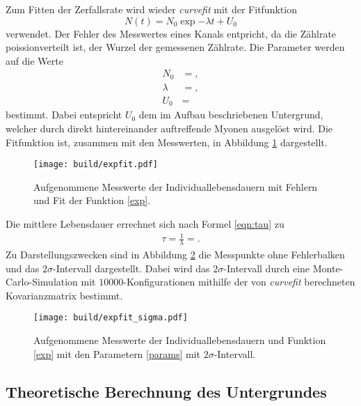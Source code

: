 Zum Fitten der Zerfallsrate wird wieder \emph{curvefit} mit der Fitfunktion
\begin{equation}
  N(t) = N_0 \exp{-\lambda t} + U_0 \label{exp}
\end{equation}
verwendet.
Der Fehler des Messwertes eines Kanals entpricht, da die Zählrate poissionverteilt ist, der Wurzel der gemessenen Zählrate. %
Die Parameter werden auf die Werte \label{params}
\begin{align*}
  N_0 &= ,\\
  \lambda &= ,\\
  U_0 &= 
\end{align*}
bestimmt.
Dabei entspricht $U_0$ dem im Aufbau beschriebenen Untergrund, welcher durch direkt hintereinander auftreffende Myonen ausgelöst wird.
Die Fitfunktion ist, zusammen mit den Messwerten, in Abbildung \ref{plot:punkte_err_fit} dargestellt.
\begin{figure}
  \centering
  \texttt{[image: build/expfit.pdf]}
  \caption{Aufgenommene Messwerte der Individuallebensdauern mit Fehlern und Fit der Funktion \ref{exp}.}
  \label{plot:punkte_err_fit}
\end{figure}
Die mittlere Lebensdauer errechnet sich nach Formel \eqref{eqn:tau} zu
\begin{align*}
  \tau = \frac{1}{\lambda} = .
\end{align*}
Zu Darstellungszwecken sind in Abbildung \ref{plot:punkte_sigma} die Messpunkte ohne Fehlerbalken und das $2\sigma$-Intervall dargestellt.
Dabei wird das $2\sigma$-Intervall durch eine Monte-Carlo-Simulation mit $\num{10000}$-Konfigurationen mithilfe der von \emph{curvefit} berechneten Kovarianzmatrix bestimmt.

\begin{figure}
  \centering
  \texttt{[image: build/expfit\_sigma.pdf]}
  \caption{Aufgenommene Messwerte der Individuallebensdauern und Funktion \ref{exp} mit den Parametern \ref{params} mit $2\sigma$-Intervall.}
  \label{plot:punkte_sigma}
\end{figure}


\subsection{Theoretische Berechnung des Untergrundes}

